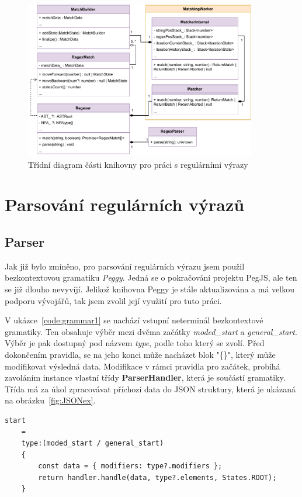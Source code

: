 \begin{figure}[!h]
	\centering
	\includegraphics[width=0.9\textwidth]{Figures/UML_RGXR.pdf}
	\caption{Třídní diagram části knihovny pro práci s regulárními výrazy}
	\label{fig:ARCH_RGXR}
\end{figure} 

\section{Parsování regulárních výrazů}\label{sec:Parse}

\subsection*{Parser}

Jak již bylo zmíněno, pro parsování regulárních výrazu jsem použil bezkontextovou gramatiku \textit{Peggy}.
Jedná se o pokračování projektu PegJS, ale ten se již dlouho nevyvíjí. 
Jelikož knihovna Peggy je stále aktualizována a má velkou podporu vývojářů, tak jsem zvolil její využití pro tuto práci.

V ukázce~\ref{code:grammar1} se nachází vstupní neterminál bezkontextové gramatiky. 
Ten obsahuje výběr mezi dvěma začátky \textit{moded\_start} a \textit{general\_start}.
Výběr je pak dostupný pod názvem \textit{type}, podle toho který se zvolí.
Před dokončením pravidla, se na jeho konci může nacházet blok "\{\}", který může modifikovat výsledná data.
Modifikace v rámci pravidla pro začátek, probíhá zavoláním instance vlastní třídy \textbf{ParserHandler}, která je součástí gramatiky.
Třída má za úkol zpracovávat příchozí data do JSON struktury, která je ukázaná na obrázku~\ref{fig:JSONex}.

\begin{code}[!ht]
	\begin{verbatim}
start 
	= 
	type:(moded_start / general_start)
	{
		const data = { modifiers: type?.modifiers };
		return handler.handle(data, type?.elements, States.ROOT);
	}
	\end{verbatim}
	\caption{Počáteční neterminál}
	\label{code:grammar1}
\end{code}

